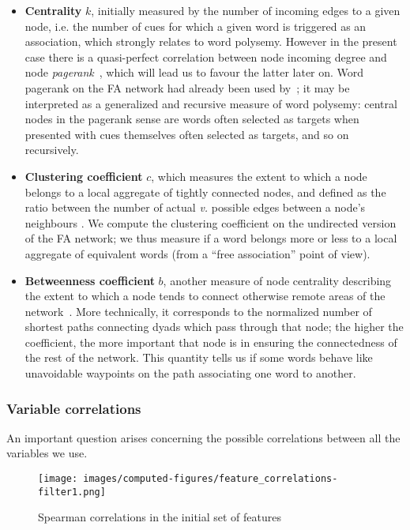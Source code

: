 \begin{itemize}
    \item \textbf{Centrality} $k$, initially measured by the number of incoming edges to a given node, i.e. the number of cues for which a given word is triggered as an association, which strongly relates to word polysemy.
    However in the present case there is a quasi-perfect correlation between node incoming degree and node \emph{pagerank}~\citep{Page99}, which will lead us to favour the latter later on. Word pagerank on the FA network had already been used by~\citet{Griffiths07}; it may be interpreted as a generalized and recursive measure of word polysemy: central nodes in the pagerank sense are words often selected as targets when presented with cues themselves often selected as targets, and so on recursively.
    \item \textbf{Clustering coefficient} $c$, which measures the extent to which a node belongs to a local aggregate of tightly connected nodes, and defined as the ratio between the number of actual \emph{v.} possible edges between a node's neighbours \cite{watt-coll}.
    We compute the clustering coefficient on the undirected version of the FA network; we thus measure if a word belongs more or less to a local aggregate of equivalent words (from a ``free association'' point of view).
    \item \textbf{Betweenness coefficient} $b$, another measure of node centrality describing the extent to which a node tends to connect otherwise remote areas of the network~\citep{free:set}.
    More technically, it corresponds to the normalized number of shortest paths connecting dyads which pass through that node; the higher the coefficient, the more important that node is in ensuring the connectedness of the rest of the network.
    This quantity tells us if some words behave like unavoidable waypoints on the path associating one word to another.
\end{itemize}

\subsubsection{Variable correlations}

An important question arises concerning the possible correlations between all the variables we use.

\begin{figure}[!th]
    \centering
    \texttt{[image: images/computed-figures/feature\_correlations-filter1.png]}
    \caption{Spearman correlations in the initial set of features}
    \label{fig:feature-corrs-initial}
\end{figure}

